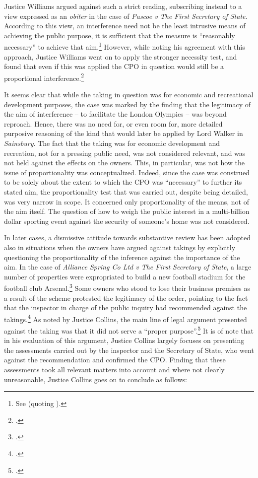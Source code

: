 Justice Williams argued against such a strict reading, subscribing instead to a view expressed as an {\it obiter} in the case of {\it Pascoe v The First Secretary of State}. According to this view, an interference need not be the least intrusive means of achieving the public purpose, it is sufficient that the measure is ``reasonably necessary'' to achieve that aim.\footnote{See \cite[74-75]{pascoe06} (quoting \cite[25]{clay04}).} However, while noting his agreement with this approach, Justice Williams went on to apply the stronger necessity test, and found that even if this was applied the CPO in question would still be a proportional interference.\footcite[41-50]{smith08}

It seems clear that while the taking in question was for economic and recreational development purposes, the case was marked by the finding that the legitimacy of the aim of interference -- to facilitate the London Olympics -- was beyond reproach. Hence, there was no need for, or even room for, more detailed purposive reasoning of the kind that would later be applied by Lord Walker in {\it Sainsbury}. The fact that the taking was for economic development and recreation, not for a pressing public need, was not considered relevant, and was not held against the effects on the owners. This, in particular, was not how the issue of proportionality was conceptualized. Indeed, since the case was construed to be solely about the extent to which the CPO was ``necessary'' to further its stated aim, the proportionality test that was carried out, despite being detailed, was very narrow in scope. It concerned only proportionality of the means, not of the aim itself. The question of how to weigh the public interest in a multi-billion dollar sporting event against the security of someone's home was not considered.

In later cases, a dismissive attitude towards substantive review has been adopted also in situations when the owners have argued against takings by explicitly questioning the proportionality of the inference against the importance of the aim. In the case of {\it Alliance Spring Co Ltd v The First Secretary of State}, a large number of properties were expropriated to build a new football stadium for the football club Arsenal.\footcite{alliance06} Some owners who stood to lose their business premises as a result of the scheme protested the legitimacy of the order, pointing to the fact that the inspector in charge of the public inquiry had recommended against the takings.\footcite[6-7]{alliance06} As noted by Justice Collins, the main line of legal argument presented against the taking was that it did not serve a ``proper purpose''.\footcite[19]{alliance06} It is of note that in his evaluation of this argument, Justice Collins largely focuses on presenting the assessments carried out by the inspector and the Secretary of State, who went against the recommendation and confirmed the CPO. Finding that these assessments took all relevant matters into account and where not clearly unreasonable, Justice Collins goes on to conclude as follows: 

